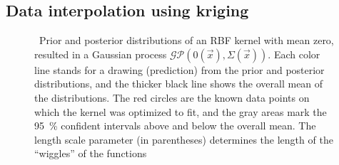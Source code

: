 \begin{description}
%	
\end{description}

\subsection{Data interpolation using kriging}
\label{subsec:interploating_data_using_kriging}
	
\begin{figure}[t]
	\centering
	\hfill %
	\caption[Prior and posterior of RBF kernel]
		{\hspace{-0.18cm}\footnotemark\ 
		Prior and posterior distributions of an RBF kernel with mean zero, resulted in a Gaussian process $\mathcal{GP}\left( 0 (\vec{x}), \Sigma(\vec{x}) \right)$.
		Each color line stands for a drawing (prediction) from the prior and posterior distributions, and the thicker black line shows the overall mean of the distributions.
		The red circles are the known data points on which the kernel was optimized to fit, and the gray areas mark the \SI{95}{\percent} confident intervals above and below the overall mean.
		The length scale parameter (in parentheses) determines the length of the \enquote{wiggles} of the functions}
	\label{fig:RBF_prior_posterior}
\end{figure}

